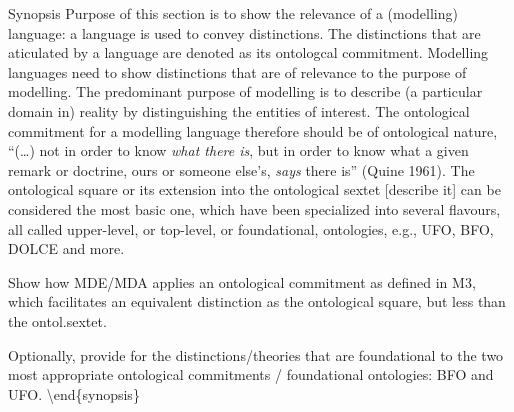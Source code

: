 \documentclass[a4paper,11pt,oneside,oldfontcommands]{memoir}
\theoremstyle{definition}
\theoremstyle{break}		%
\numberwithin{equation}{chapter}
\numberwithin{figure}{chapter}
\begin{document}
Synopsis Purpose of this section is to show the relevance of a
(modelling) language: a language is used to convey distinctions. The
distinctions that are aticulated by a language are denoted as its
ontologcal commitment. Modelling languages need to show distinctions
that are of relevance to the purpose of modelling. The predominant
purpose of modelling is to describe (a particular domain in) reality by
distinguishing the entities of interest. The ontological commitment for
a modelling language therefore should be of ontological nature,
``(\ldots{}) not in order to know \emph{what there is}, but in order to
know what a given remark or doctrine, ours or someone else's,
\emph{says} there is'' (Quine 1961). The ontological square or its
extension into the ontological sextet {[}describe it{]} can be
considered the most basic one, which have been specialized into several
flavours, all called upper-level, or top-level, or foundational,
ontologies, e.g., UFO, BFO, DOLCE and more.

Show how MDE/MDA applies an ontological commitment as defined in M3,
which facilitates an equivalent distinction as the ontological square,
but less than the ontol.sextet.

Optionally, provide for the distinctions/theories that are foundational
to the two most appropriate ontological commitments / foundational
ontologies: BFO and UFO. \textbackslash{}end\{synopsis\}
\end{document}
